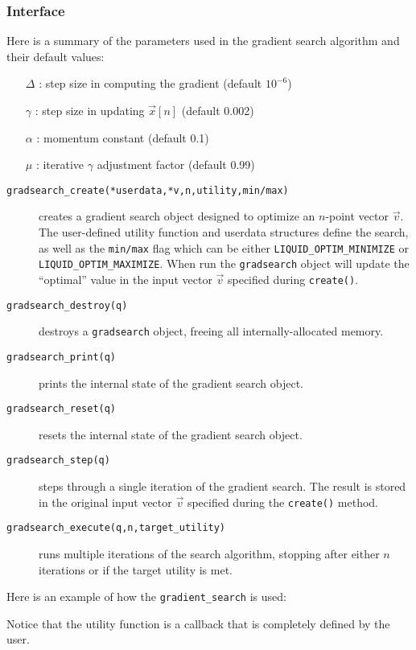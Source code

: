 \subsubsection{Interface}
Here is a summary of the parameters used in the gradient search algorithm and
their default values:
\begin{itemize}
\item[$\Delta$] : step size in computing the gradient (default $10^{-6}$)
\item[$\gamma$] : step size in updating $\vec{x}[n]$ (default 0.002)
\item[$\alpha$] : momentum constant (default 0.1)
\item[$\mu$]    : iterative $\gamma$ adjustment factor (default 0.99)
\end{itemize}
%
\begin{description}
\item[{\tt gradsearch\_create(*userdata,*v,n,utility,min/max)}]
    creates a gradient search object designed to optimize an $n$-point
    vector $\vec{v}$.
    The user-defined utility function and userdata structures define the
    search, as well as the {\tt min/max} flag which can be either
    {\tt LIQUID\_OPTIM\_MINIMIZE} or
    {\tt LIQUID\_OPTIM\_MAXIMIZE}.
    When run the {\tt gradsearch} object will update the ``optimal''
    value in the input vector $\vec{v}$ specified during
    {\tt create()}.
\item[{\tt gradsearch\_destroy(q)}]
    destroys a {\tt gradsearch} object, freeing all internally-allocated
    memory.
\item[{\tt gradsearch\_print(q)}]
    prints the internal state of the gradient search object.
\item[{\tt gradsearch\_reset(q)}]
    resets the internal state of the gradient search object.
\item[{\tt gradsearch\_step(q)}]
    steps through a single iteration of the gradient search.
    The result is stored in the original input vector $\vec{v}$
    specified during the {\tt create()} method.
\item[{\tt gradsearch\_execute(q,n,target\_utility)}]
    runs multiple iterations of the search algorithm,
    stopping after either $n$ iterations or if the target utility is
    met.
\end{description}
%
Here is an example of how the {\tt gradient\_search} is used:
% 

%
Notice that the utility function is a callback that is completely
defined by the user.


